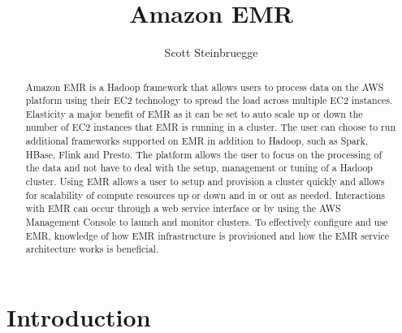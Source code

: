 \title{Amazon EMR}


\author{Scott Steinbruegge}


\renewcommand{\shortauthors}{S. Steinbruegge}


\begin{abstract}
Amazon EMR is a Hadoop framework that allows users to process data on the AWS 
platform using their EC2 technology to spread the load across multiple EC2 
instances. Elasticity a major benefit of EMR as it can be set to auto scale 
up or down the number of EC2 instances that EMR is running in a cluster. The 
user can choose to run additional frameworks supported on EMR in addition to 
Hadoop, such as Spark, HBase, Flink and Presto. The platform allows the user 
to focus on the processing of the data and not have to deal with the setup, 
management or tuning of a Hadoop cluster. Using EMR allows a user to setup 
and provision a cluster quickly and allows for scalability of compute
resources up or down and in or out as needed. Interactions with EMR can
occur through a web service interface or by using the AWS Management Console
to launch and monitor clusters. To effectively configure and use EMR, 
knowledge of how EMR infrastructure is provisioned and how the EMR service
architecture works is beneficial.  
\end{abstract}


\maketitle

\section{Introduction}

